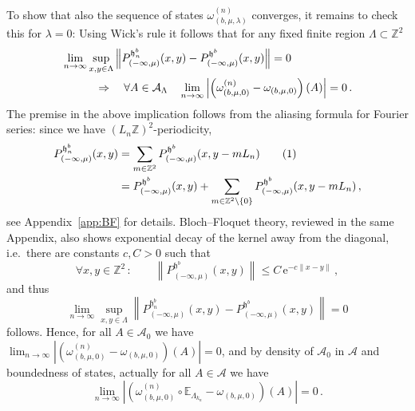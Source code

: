 \documentclass[a4paper]{article}
\newcommand{\E}{\mathbb{E}}
\newcommand{\e}{\mathrm{e}}
\newcommand{\w}{\omega}
\newcommand{\Z}{\mathbb{Z}}
\newcommand{\mA}{\mathcal{A}}
\theoremstyle{plain}
\theoremstyle{definition}
\theoremstyle{remark}
\newcommand\numberthis{\addtocounter{equation}{1}\tag{\theequation}}
\renewcommand{\(}{\left(}
\renewcommand{\)}{\right)}
\begin{document}
To show that also the sequence of states $\w_{(b,\mu,\lambda)}^{(n)}$ converges, it remains to check this  for $\lambda=0$:
Using Wick's rule it follows that for any fixed finite region $\Lambda\subset\Z^2$ 
\begin{align*}
    \hspace{2em}&\hspace{-2em}
    \lim_{n\to\infty} \sup_{x,y\in\Lambda} \left\|P_{(-\infty,\mu)}^{\mathfrak{h}^b_{n}}(x,y) - P_{(-\infty,\mu)}^{\mathfrak{h}^b}(x,y)\right\| =0 
    \\
    &\quad\Rightarrow\quad 
    \forall A\in\mA_\Lambda\quad \lim_{n\to\infty}
    \left|\left(\w_{(b,\mu,0)}^{(n)}-\w_{(b,\mu,0)}\right)(A)\right|=0\,.    
\end{align*}
The premise in the above implication follows  from the aliasing formula for Fourier series: since we have $(L_n\Z)^2 $-periodicity,
\begin{align*}
    P_{(-\infty,\mu)}^{\mathfrak{h}^b_{n}}(x,y) 
    &= 
    \sum_{m\in \Z^2} P_{(-\infty,\mu)}^{\mathfrak{h}^b}(x,y-mL_n ) \numberthis \label{eq:fermi_restriction} 
    \\ 
    &=
    P_{(-\infty,\mu)}^{\mathfrak{h}^b}(x,y) + \sum_{m\in\Z^2\setminus\{0\}} P_{(-\infty,\mu)}^{\mathfrak{h}^b}(x,y-mL_n)\,,    
\end{align*}
see Appendix~\ref{app:BF} for details.
Bloch--Floquet theory, reviewed in the same Appendix, also shows exponential decay of the kernel away from the diagonal, i.e.\ there are constants $c,C>0$ such that 
\begin{equation} \label{eqn:decay_of_kernel}
\forall x,y\in\Z^2\,:\qquad \left\|P_{(-\infty,\mu)}^{\mathfrak{h}^b}(x,y )\right\|\leq C\,\e^{-c\|x-y\|}\,,
\end{equation}
and thus
\[ \lim_{n\to\infty} \sup_{x,y\in\Lambda} \left\|P_{(-\infty,\mu)}^{\mathfrak{h}^b_{n}}(x,y) - P_{(-\infty,\mu)}^{\mathfrak{h}^b}(x,y)\right\| =0 \]
follows.
Hence, for all $A\in\mA_0$ we have $\lim_{n\to\infty}
|(\w_{(b,\mu,0)}^{(n)}-\w_{(b,\mu,0)})(A)|=0$, and by density of $\mA_0$ in $\mA$ and boundedness of states, actually  for all $A\in\mA$   we have  
\begin{equation}\label{eq:statecobv}
    \lim_{n\to\infty}
|(\w_{(b,\mu,0)}^{(n)}\circ \E_{\Lambda_{k_n}}-\w_{(b,\mu,0)})(A)|=0\,.
\end{equation}
\end{document}
